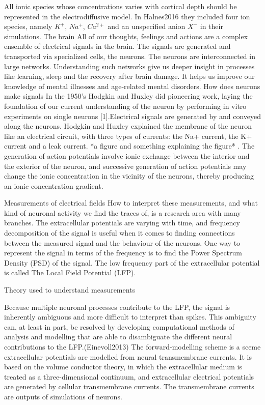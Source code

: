 \documentclass{article}
\begin{document}
All ionic species whose concentrations varies with cortical depth should be represented in the electrodiffusive model. In Halnes2016 they included four ion species, namely $K^+$, $Na^+$, $Ca^{2+}$ and an unspecified anion $X^-$ in their simulations.
{The brain}
All of our thoughts, feelings and actions are a complex ensemble of electrical signals in the brain. The signals are generated and transported via specialized cells, the neurons. The neurons are interconnected in large networks. Understanding such networks give us deeper insight in processes like learning, sleep and the recovery after brain damage. It helps us improve our knowledge of mental illnesses and age-related mental disorders.
{How does neurons make signals}
In the 1950’s Hodgkin and Huxley did pioneering work, laying the foundation of our current understanding of the neuron by performing in vitro experiments on single neurons [1].Electrical signals are generated by and conveyed along the neurons. Hodgkin and Huxley explained the membrane of the neuron like an electrical circuit, with three types of currents: the Na+ current, the K+ current and a leak current. *a figure and something explaining the figure* . The generation of action potentials involve ionic exchange between the interior and the exterior of the neuron, and successive generation of action potentials may change the ionic concentration in the vicinity of the neurons, thereby producing an ionic concentration gradient.

{Measurements of electrical fields}
 How to interpret these measurements, and what kind of neuronal activity we find the traces of, is a research area with many branches. The extracellular potentials are varying with time, and frequency decomposition of the signal is useful when it comes to finding connections between the measured signal and the behaviour of the neurons. One way to represent the signal in terms of the frequency is to find the Power Spectrum Density (PSD) of the signal. The low frequency part of the extracellular potential is called The Local Field Potential (LFP). 

{Theory used to understand measurements}

Because multiple neuronal processes contribute to the LFP, the signal is inherently ambiguous and more difficult to interpret than spikes. This ambiguity can, at least in part, be resolved by developing computational methods of analysis and modelling that are able to disambiguate the different
neural contributions to the LFP.(Einevoll2013)  The forward-modelling scheme is a sceme extracellular potentials are modelled from neural
transmembrane currents. It is based on the volume conductor theory, in which the extracellular medium is treated as a
three-dimensional continuum, and extracellular electrical potentials are
generated by cellular transmembrane currents. The transmembrane currents are outputs of simulations of neurons.
\end{document}
